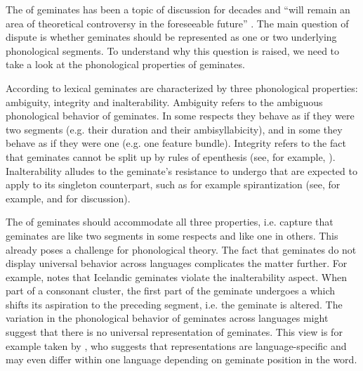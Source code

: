 The  of geminates has been a topic of discussion for decades and  ``will remain an area of theoretical controversy in the foreseeable future'' \cite[22]{Davis.2011}. The main question of dispute is whether geminates should be represented as one or two underlying phonological segments. To understand why this question is raised, we need to take a look at the phonological properties of geminates. 

According to \cite{Hayes.1986b}  lexical geminates are characterized by three phonological properties: ambiguity, integrity and inalterability. Ambiguity refers to the ambiguous phonological behavior of geminates. In some respects they behave as if they were two segments (e.g. their duration and their ambisyllabicity), and in some they behave as if they were one (e.g. one feature bundle). Integrity refers to the fact that geminates  cannot be split up by rules of epenthesis (see, for example,  \citealt{AbuSalim.,Kenstowicz.1994}).  Inalterability alludes to the {geminate's} resistance to undergo  that are expected to apply to its singleton counterpart, such as for example spirantization (see, for example, \citealt {Kenstowicz.1994} and \citealt[Chapter 5]{Kirchner.2001} for discussion). 

The  of geminates should accommodate all three properties, i.e. capture that geminates are like two segments in some respects and like one in others. This already poses a challenge for phonological theory. The fact that geminates do not display universal behavior across languages complicates the matter further. For example, \cite{Kenstowicz.1994} notes that Icelandic geminates violate the inalterability aspect. When part of a consonant cluster, the first part of the geminate undergoes a  which shifts its aspiration to the preceding segment, i.e. the geminate is altered.
 The variation in the phonological behavior of geminates across languages might suggest that there is no universal representation of geminates.  This view is for example taken by \cite{Ham.2001}, who suggests that representations are language-specific and may even differ within one language depending on geminate position in the word.
 
